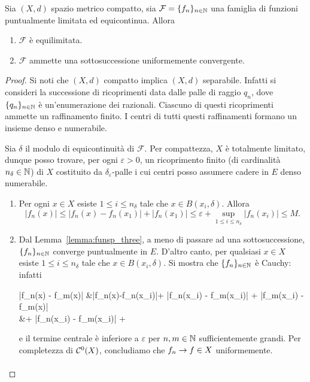 \begin{theorem}
	Sia $(X,d)$ spazio metrico compatto, sia $\mathcal F =\{f_n\}_{n \in \mathbb{N}}$ una famiglia di funzioni puntualmente limitata ed equicontinua.
	Allora
	\begin{enumerate}
		\item $\mathcal F$ è equilimitata.
		\item $\mathcal F$ ammette una sottosuccessione uniformemente convergente.
	\end{enumerate}
\end{theorem}
\begin{proof}
	Si noti che $(X, d)$ compatto implica $(X,d)$ separabile. Infatti si consideri la successione di ricoprimenti data dalle palle di raggio $q_n$, dove $\{q_n\}_{n \in \mathbb{N}}$ è un'enumerazione dei razionali. Ciascuno di questi ricoprimenti ammette un raffinamento finito. I centri di tutti questi raffinamenti formano un insieme denso e numerabile.

	Sia $\delta$ il modulo di equicontinuità di $\mathcal F$. Per compattezza, $X$ è totalmente limitato, dunque posso trovare, per ogni $\varepsilon > 0$, un ricoprimento finito (di cardinalità $n_\delta \in \mathbb{N}$) di $X$ costituito da $\delta_\varepsilon$-palle i cui centri posso assumere cadere in $E$ denso numerabile.

	\begin{enumerate}
		\item Per ogni $x \in X$ esiste $1 \leq i \leq n_\delta$ tale che $x \in B(x_i, \delta)$. Allora
		\begin{equation*}
			|f_n(x)| \leq |f_n(x) - f_n(x_1)| + |f_n(x_1)| \leq \varepsilon + \sup_{1 \leq i \leq n_\delta} |f_n(x_i)| \leq M.
		\end{equation*}

		\item Dal Lemma~\ref{lemma:funsp_three}, a meno di passare ad una sottosuccessione, $\{f_n\}_{n \in \mathbb{N}}$ converge puntualmente in $E$. D'altro canto, per qualsiasi $x \in X$ esiste $1 \leq i \leq n_\delta$ tale che $x \in B(x_i, \delta)$. Si mostra che $\{f_n\}_{n \in \mathbb{N}}$ è Cauchy: infatti
		\begin{eqalign*}
			|f_n(x) - f_m(x)| &\leq |f_n(x)-f_n(x_i)|+ |f_n(x_i) - f_m(x_i)| + |f_m(x_i) - f_m(x)|\\
			&\leq \varepsilon + |f_n(x_i) - f_m(x_i)| + \varepsilon
		\end{eqalign*}
		e il termine centrale è inferiore a $\varepsilon$ per $n,m \in \mathbb{N}$ sufficientemente grandi.
		Per completezza di $\mathcal{C}^0(X)$, concludiamo che $f_n \underset{{}}{\rightarrow} f \in X$ uniformemente.
	\end{enumerate}
\end{proof}

